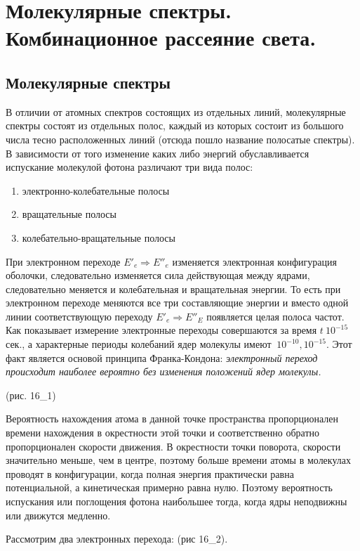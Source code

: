 \chapter{Молекулярные спектры. Комбинационное рассеяние света.}

\section{Молекулярные спектры}
В отличии от атомных спектров состоящих из отдельных линий, молекулярные 
спектры состоят из отдельных полос, каждый из которых состоит из большого 
числа тесно расположенных линий (отсюда пошло название полосатые спектры). 
В зависимости от того изменение каких либо энергий обуславливается 
испускание молекулой фотона различают три вида полос:
\begin{enumerate}
    \item электронно-колебательные полосы
    \item вращательные полосы
    \item колебательно-вращательные полосы
\end{enumerate}

При электронном переходе \( E'_e \Rightarrow E''_e \) изменяется 
электронная конфигурация оболочки, следовательно изменяется сила 
действующая между ядрами, следовательно меняется и колебательная и 
вращательная энергии. То есть при электронном переходе меняются все три 
составляющие энергии и вместо одной линии соответствующую переходу 
\( E'_e \Rightarrow E''_E \) появляется целая полоса частот. Как 
показывает измерение электронные переходы совершаются за время 
\( t ~ 10^{-15} \) сек., а характерные периоды колебаний ядер молекулы 
имеют \( ~ 10^{-10}, 10^{-15} \). Этот факт является основой принципа 
Франка-Кондона: \emph{электронный переход происходит наиболее вероятно без 
изменения положений ядер молекулы.} 

(рис. 16\_1)

Вероятность нахождения атома в данной точке пространства пропорционален 
времени нахождения в окрестности этой точки и соответственно обратно 
пропорционален скорости движения. В окрестности точки поворота, скорости 
значительно меньше, чем в центре, поэтому больше времени атомы в молекулах 
проводят в конфигурации, когда полная энергия практически равна 
потенциальной, а кинетическая примерно равна нулю. Поэтому вероятность 
испускания или поглощения фотона наибольшее тогда, когда ядры неподвижны 
или движутся медленно.

Рассмотрим два электронных перехода: (рис 16\_2).

